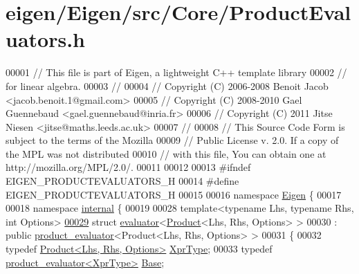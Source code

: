 \hypertarget{eigen_2_eigen_2src_2_core_2_product_evaluators_8h_source}{}\section{eigen/\+Eigen/src/\+Core/\+Product\+Evaluators.h}
\label{eigen_2_eigen_2src_2_core_2_product_evaluators_8h_source}

\begin{DoxyCode}
00001 \textcolor{comment}{// This file is part of Eigen, a lightweight C++ template library}
00002 \textcolor{comment}{// for linear algebra.}
00003 \textcolor{comment}{//}
00004 \textcolor{comment}{// Copyright (C) 2006-2008 Benoit Jacob <jacob.benoit.1@gmail.com>}
00005 \textcolor{comment}{// Copyright (C) 2008-2010 Gael Guennebaud <gael.guennebaud@inria.fr>}
00006 \textcolor{comment}{// Copyright (C) 2011 Jitse Niesen <jitse@maths.leeds.ac.uk>}
00007 \textcolor{comment}{//}
00008 \textcolor{comment}{// This Source Code Form is subject to the terms of the Mozilla}
00009 \textcolor{comment}{// Public License v. 2.0. If a copy of the MPL was not distributed}
00010 \textcolor{comment}{// with this file, You can obtain one at http://mozilla.org/MPL/2.0/.}
00011 
00012 
00013 \textcolor{preprocessor}{#ifndef EIGEN\_PRODUCTEVALUATORS\_H}
00014 \textcolor{preprocessor}{#define EIGEN\_PRODUCTEVALUATORS\_H}
00015 
00016 \textcolor{keyword}{namespace }\hyperlink{namespace_eigen}{Eigen} \{
00017   
00018 \textcolor{keyword}{namespace }\hyperlink{namespaceinternal}{internal} \{
00019 
00028 \textcolor{keyword}{template}<\textcolor{keyword}{typename} Lhs, \textcolor{keyword}{typename} Rhs, \textcolor{keywordtype}{int} Options>
\hyperlink{struct_eigen_1_1internal_1_1evaluator_3_01_product_3_01_lhs_00_01_rhs_00_01_options_01_4_01_4}{00029} \textcolor{keyword}{struct }\hyperlink{struct_eigen_1_1internal_1_1evaluator}{evaluator}<\hyperlink{group___core___module_class_eigen_1_1_product}{Product}<Lhs, Rhs, Options> > 
00030  : \textcolor{keyword}{public} \hyperlink{struct_eigen_1_1internal_1_1product__evaluator}{product\_evaluator}<Product<Lhs, Rhs, Options> >
00031 \{
00032   \textcolor{keyword}{typedef} \hyperlink{group___core___module_class_eigen_1_1_product}{Product<Lhs, Rhs, Options>} \hyperlink{group___core___module_class_eigen_1_1_product}{XprType};
00033   \textcolor{keyword}{typedef} \hyperlink{struct_eigen_1_1internal_1_1product__evaluator}{product\_evaluator<XprType>} \hyperlink{struct_eigen_1_1internal_1_1product__evaluator}{Base};

\end{DoxyCode}
